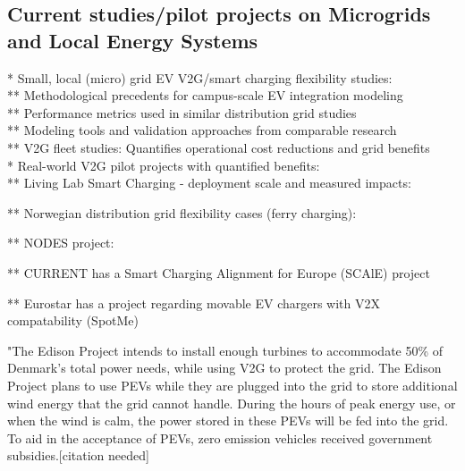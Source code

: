 \subsection{Current studies/pilot projects on Microgrids and Local Energy Systems}

* Small, local (micro) grid EV V2G/smart charging flexibility studies: \\
** Methodological precedents for campus-scale EV integration modeling \\
** Performance metrics used in similar distribution grid studies \\
** Modeling tools and validation approaches from comparable research \\
** V2G fleet studies: Quantifies operational cost reductions and grid benefits \\


* Real-world V2G pilot projects with quantified benefits: \\
** Living Lab Smart Charging - deployment scale and measured impacts: \\

** Norwegian distribution grid flexibility cases (ferry charging): \\

** NODES project: \\

** CURRENT has a Smart Charging Alignment for Europe (SCAlE) project

** Eurostar has a project regarding movable EV chargers with V2X compatability (SpotMe)


"The Edison Project intends to install enough turbines to accommodate 50\% of Denmark's total power needs, while using V2G to protect the grid. The Edison Project plans to use PEVs while they are plugged into the grid to store additional wind energy that the grid cannot handle. During the hours of peak energy use, or when the wind is calm, the power stored in these PEVs will be fed into the grid. To aid in the acceptance of PEVs, zero emission vehicles received government subsidies.[citation needed]

